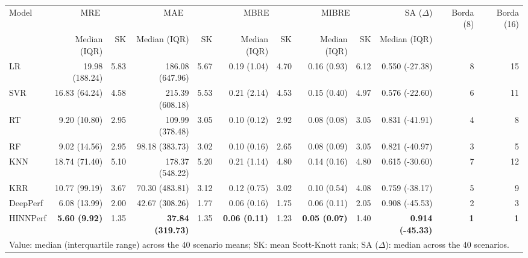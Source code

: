\begin{tabular}{lrrrrrrrrrrr}
\toprule
Model & \multicolumn{2}{c}{MRE} & \multicolumn{2}{c}{MAE} & \multicolumn{2}{c}{MBRE} & \multicolumn{2}{c}{MIBRE} & SA ($\Delta$) & Borda (8) & Borda (16) \\
 & Median (IQR) & SK & Median (IQR) & SK & Median (IQR) & SK & Median (IQR) & SK & Median (IQR) &  &  \\
\midrule
LR & 19.98 (188.24) & 5.83 & 186.08 (647.96) & 5.67 & 0.19 (1.04) & 4.70 & 0.16 (0.93) & 6.12 & 0.550 (-27.38) & 8 & 15 \\
SVR & 16.83 (64.24) & 4.58 & 215.39 (608.18) & 5.53 & 0.21 (2.14) & 4.53 & 0.15 (0.40) & 4.97 & 0.576 (-22.60) & 6 & 11 \\
RT & 9.20 (10.80) & 2.95 & 109.99 (378.48) & 3.05 & 0.10 (0.12) & 2.92 & 0.08 (0.08) & 3.05 & 0.831 (-41.91) & 4 & 8 \\
RF & 9.02 (14.56) & 2.95 & 98.18 (383.73) & 3.02 & 0.10 (0.16) & 2.65 & 0.08 (0.09) & 3.05 & 0.821 (-40.97) & 3 & 5 \\
KNN & 18.74 (71.40) & 5.10 & 178.37 (548.22) & 5.20 & 0.21 (1.14) & 4.80 & 0.14 (0.16) & 4.80 & 0.615 (-30.60) & 7 & 12 \\
KRR & 10.77 (99.19) & 3.67 & 70.30 (483.81) & 3.12 & 0.12 (0.75) & 3.02 & 0.10 (0.54) & 4.08 & 0.759 (-38.17) & 5 & 9 \\
DeepPerf & 6.08 (13.99) & 2.00 & 42.67 (308.26) & 1.77 & 0.06 (0.16) & 1.75 & 0.06 (0.11) & 2.05 & 0.908 (-45.53) & 2 & 3 \\
HINNPerf & \textbf{5.60 (9.92)} & 1.35 & \textbf{37.84 (319.73)} & 1.35 & \textbf{0.06 (0.11)} & 1.23 & \textbf{0.05 (0.07)} & 1.40 & \textbf{0.914 (-45.33)} & \textbf{1} & \textbf{1} \\
\bottomrule
\multicolumn{12}{l}{Value: median (interquartile range) across the 40 scenario means; SK: mean Scott-Knott rank; SA ($\Delta$): median across the 40 scenarios.} \\
\end{tabular}
